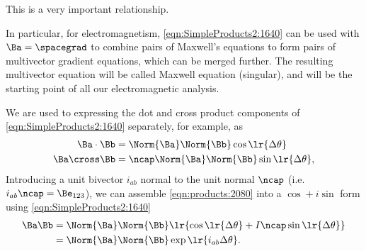 This is a very important relationship.

In particular, for electromagnetism, \cref{eqn:SimpleProducts2:1640} can
be used with \( \Ba = \spacegrad \) to combine pairs of Maxwell's equations to form pairs of multivector gradient equations,
which can be merged further.
The resulting multivector equation will be
called
Maxwell equation (singular), and will be the starting point of all our electromagnetic analysis.

We are used to expressing the dot and cross product components of
\cref{eqn:SimpleProducts2:1640} separately, for example, as
\begin{equation}\label{eqn:products:2080}
\begin{aligned}
\Ba \cdot \Bb &= \Norm{\Ba} \Norm{\Bb} \cos\lr{ \Delta \theta } \\
\Ba \cross \Bb &= \ncap \Norm{\Ba} \Norm{\Bb} \sin\lr{ \Delta \theta },
\end{aligned}
\end{equation}
Introducing a unit bivector \( i_{ab} \) normal to the unit normal \( \ncap \)
(i.e. \( i_{ab} \ncap = \Be_{123} \)), we can assemble
\cref{eqn:products:2080} into a \( \cos + i \sin \) form using
\cref{eqn:SimpleProducts2:1640}
\begin{equation}\label{eqn:products:2100}
\begin{aligned}
\Ba \Bb &=
\Norm{\Ba} \Norm{\Bb} \lr{
\cos\lr{ \Delta \theta }
+
I \ncap
\sin\lr{ \Delta \theta }
} \\
&=
\Norm{\Ba} \Norm{\Bb} \exp\lr{ i_{ab} \Delta \theta }.
\end{aligned}
\end{equation}


